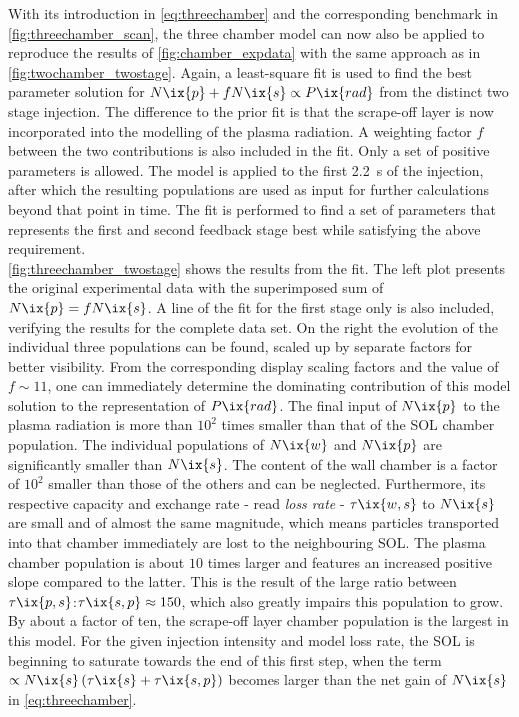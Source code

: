 %
            With its introduction in \cref{eq:threechamber} and the corresponding benchmark in \cref{fig:threechamber_scan}, the three chamber model can now also be applied to reproduce the results of \cref{fig:chamber_expdata} with the same approach as in \cref{fig:twochamber_twostage}. Again, a least-square fit is used to find the best parameter solution for $N\ix{p}+fN\ix{s}\propto P\ix{rad}$ from the distinct two stage injection. The difference to the prior fit is that the scrape-off layer is now incorporated into the modelling of the plasma radiation. A weighting factor $f$ between the two contributions is also included in the fit. Only a set of positive parameters is allowed. The model is applied to the first \SI{2.2}{\second} of the injection, after which the resulting populations are used as input for further calculations beyond that point in time. The fit is performed to find a set of parameters that represents the first and second feedback stage best while satisfying the above requirement.\\%
            \autoref{fig:threechamber_twostage} shows the results from the fit. The left plot presents the original experimental data with the superimposed sum of $N\ix{p}=fN\ix{s}$. A line of the fit for the first stage only is also included, verifying the results for the complete data set. On the right the evolution of the individual three populations can be found, scaled up by separate factors for better visibility. From the corresponding display scaling factors and the value of $f\sim11$, one can immediately determine the dominating contribution of this model solution to the representation of $P\ix{rad}$. The final input of $N\ix{p}$ to the plasma radiation is more than $10^{2}$ times smaller than that of the SOL chamber population. The individual populations of $N\ix{w}$ and $N\ix{p}$ are significantly smaller than $N\ix{s}$. The content of the wall chamber is a factor of $10^{2}$ smaller than those of the others and can be neglected. Furthermore, its respective capacity and exchange rate - read \textit{loss rate} - $\tau\ix{w,s}$ to $N\ix{s}$ are small and of almost the same magnitude, which means particles transported into that chamber immediately are lost to the neighbouring SOL. The plasma chamber population is about $10$ times larger and features an increased positive slope compared to the latter. This is the result of the large ratio between $\tau\ix{p,s}$:$\tau\ix{s,p}\approx150$, which also greatly impairs this population to grow. By about a factor of ten, the scrape-off layer chamber population is the largest in this model. For the given injection intensity and model loss rate, the SOL is beginning to saturate towards the end of this first step, when the term $\propto N\ix{s}\left(\tau\ix{s}+\tau\ix{s,p}\right)$ becomes larger than the net gain of $N\ix{s}$ in \cref{eq:threechamber}.\\%
